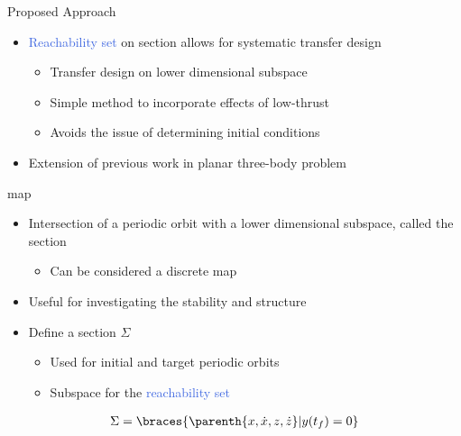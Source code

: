 \documentclass[11pt,professionalfonts]{beamer}
\def\Emph{\textcolor{RoyalBlue}}
\begin{document}
\begin{frame}{Proposed Approach} %
  \begin{itemize}
      \item \Emph{Reachability set} on \Poincare section allows for systematic transfer design
        \begin{itemize}
            \item Transfer design on lower dimensional subspace
            \item Simple method to incorporate effects of low-thrust 
            \item Avoids the issue of determining initial conditions
        \end{itemize}
        \pause
      \item Extension of previous work in planar three-body problem     
  \end{itemize}

\end{frame} %

\begin{frame}{\Poincare map}
\begin{itemize}
    \item Intersection of a periodic orbit with a lower dimensional subspace, called the \Poincare section
    \pause
        \begin{itemize}
            \item Can be considered a discrete map 
        \end{itemize}
        \pause
    \item Useful for investigating the stability and structure 
    \pause
    \item Define a \Poincare section \( \Sigma \) 
        \begin{itemize}
            \item Used for initial and target periodic orbits
            \item Subspace for the \Emph{reachability set}
        \end{itemize}
\end{itemize}

\begin{align*}
    \Sigma = \braces{\parenth{x, \dot{x}, z, \dot{z}} | y(t_f) = 0 }
\end{align*}

\end{frame}
\end{document}
